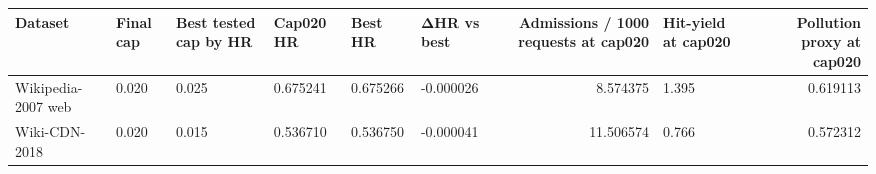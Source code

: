 \begin{tabular}{llllllrlr}
\toprule
Dataset & Final cap & Best tested cap by HR & Cap020 HR & Best HR & ΔHR vs best & Admissions / 1000 requests at cap020 & Hit-yield at cap020 & Pollution proxy at cap020 \\
\midrule
Wikipedia-2007 web & 0.020 & 0.025 & 0.675241 & 0.675266 & -0.000026 & 8.574375 & 1.395 & 0.619113 \\
Wiki-CDN-2018 & 0.020 & 0.015 & 0.536710 & 0.536750 & -0.000041 & 11.506574 & 0.766 & 0.572312 \\
\bottomrule
\end{tabular}
